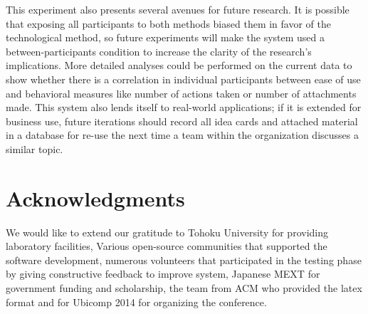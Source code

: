 \documentclass{sigchi}
\begin{document}
This experiment also presents several avenues for future research. It is possible that exposing all participants to both methods biased them in favor of the technological method, so future experiments will make the system used a between-participants condition to increase the clarity of the research's implications. More detailed analyses could be performed on the current data to show whether there is a correlation in individual participants between ease of use and behavioral measures like number of actions taken or number of attachments made. This system also lends itself to real-world applications; if it is extended for business use, future iterations should record all idea cards and attached material in a database for re-use the next time a team within the organization discusses a similar topic. 


\section{Acknowledgments}

We would like to extend our gratitude to Tohoku University for providing laboratory facilities, Various open-source communities that supported the software development, numerous volunteers that participated in the testing phase by giving constructive feedback to improve system,  Japanese MEXT for government funding and scholarship, the team from ACM who provided the latex format and for Ubicomp 2014 for organizing the conference.

%
%
%
%
%



\end{document}
